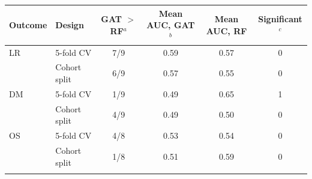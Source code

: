 \begin{tabular}{@{}llcccc@{}}
\toprule
Outcome & Design & GAT $>$ RF$^{a}$ & Mean AUC, GAT$^{b}$ & Mean AUC, RF & Significant$^{c}$ \\
\midrule
LR & 5-fold CV & 7/9 & 0.59 & 0.57 & 0 \\
 & Cohort split & 6/9 & 0.57 & 0.55 & 0 \\
\midrule
DM & 5-fold CV & 1/9 & 0.49 & 0.65 & 1 \\
 & Cohort split & 4/9 & 0.49 & 0.50 & 0 \\
\midrule
OS & 5-fold CV & 4/8 & 0.53 & 0.54 & 0 \\
 & Cohort split & 1/8 & 0.51 & 0.59 & 0 \\
\botrule
\end{tabular}
